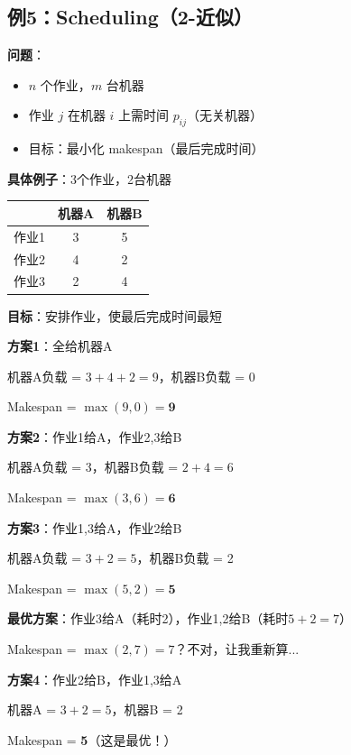 \documentclass[12pt, a4paper]{ctexart}
\begin{document}
\subsection{例5：Scheduling（2-近似）}

\begin{blackboard}[无关机器调度问题]

\textbf{问题}：
\begin{itemize}
    \item $n$ 个作业，$m$ 台机器
    \item 作业 $j$ 在机器 $i$ 上需时间 $p_{ij}$（无关机器）
    \item 目标：最小化 makespan（最后完成时间）
\end{itemize}

\textbf{具体例子}：3个作业，2台机器

\begin{center}
\begin{tabular}{c|c|c}
& 机器A & 机器B \\
\hline
作业1 & 3 & 5 \\
作业2 & 4 & 2 \\
作业3 & 2 & 4
\end{tabular}
\end{center}

\textbf{目标}：安排作业，使最后完成时间最短

\end{blackboard}

\begin{blackboard}

\textbf{方案1}：全给机器A

机器A负载 = $3 + 4 + 2 = 9$，机器B负载 = 0

Makespan = $\max(9, 0) = \mathbf{9}$

\textbf{方案2}：作业1给A，作业2,3给B

机器A负载 = 3，机器B负载 = $2 + 4 = 6$

Makespan = $\max(3, 6) = \mathbf{6}$

\textbf{方案3}：作业1,3给A，作业2给B

机器A负载 = $3 + 2 = 5$，机器B负载 = 2

Makespan = $\max(5, 2) = \mathbf{5}$

\textbf{最优方案}：作业3给A（耗时2），作业1,2给B（耗时$5+2=7$）

Makespan = $\max(2, 7) = 7$？不对，让我重新算...

\textbf{方案4}：作业2给B，作业1,3给A

机器A = $3+2=5$，机器B = 2

Makespan = \textbf{5}（这是最优！）

\end{blackboard}
\end{document}

